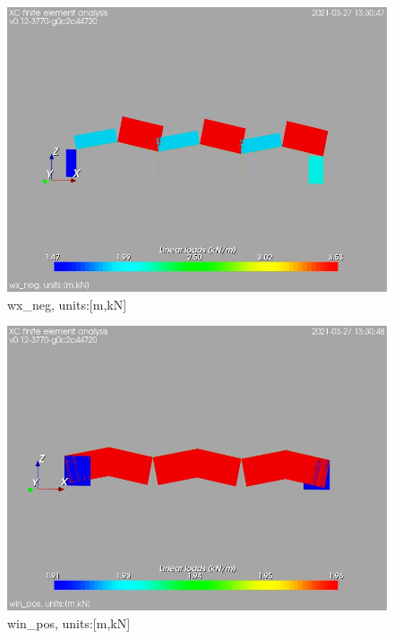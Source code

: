 \begin{figure}
\begin{center}
\includegraphics[width=\linewidth]{calc_results/sole_zeinali/text/graphics/loads/wx_negallMemberSet}
\caption{wx_neg, units:[m,kN]}
\label{wx-neg-unitsmkn}
\end{center}
\end{figure}
\begin{figure}
\begin{center}
\includegraphics[width=\linewidth]{calc_results/sole_zeinali/text/graphics/loads/win_posallMemberSet}
\caption{win_pos, units:[m,kN]}
\label{win-pos-unitsmkn}
\end{center}
\end{figure}
